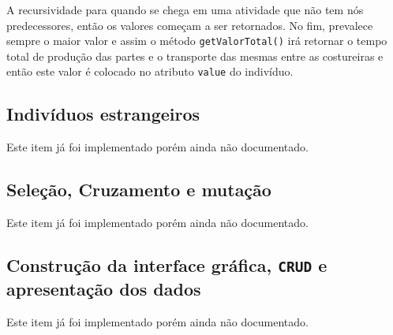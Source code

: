 A recursividade para quando se chega em uma atividade que não tem nós predecessores, então os valores começam a ser retornados. 
No fim, prevalece sempre o maior valor e assim o método \texttt{getValorTotal()} irá retornar o tempo total de 
produção das partes e o transporte das mesmas entre as costureiras e então este valor é colocado no atributo \texttt{value} do 
indivíduo.


\subsection{Indivíduos estrangeiros}
\par Este item já foi implementado porém ainda não documentado. 
  
\subsection{Seleção, Cruzamento e mutação}
\par Este item já foi implementado porém ainda não documentado.
 
\subsection{Construção da interface gráfica, \texttt{CRUD} e apresentação dos
dados} 
\par Este item já foi implementado porém ainda não documentado. 




